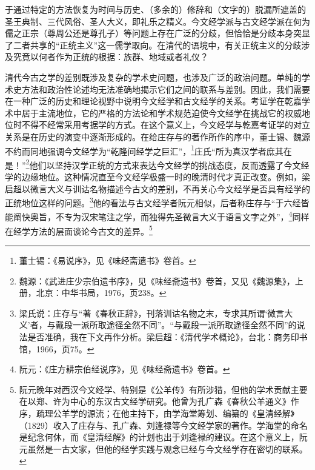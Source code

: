 \documentclass[a4paper, 12pt, openright]{ctexbook}
\begin{document}
于通过特定的方法恢复为时间与历史、（多余的）修辞和（文字的）脱漏所遮盖的圣王典制、三代风俗、圣人大义，即礼乐之精义。今文经学派与古文经学派在何为儒之正宗（尊周公还是尊孔子）等问题上存在广泛的分歧，但恰恰是分歧本身突显了二者共享的“正统主义”这一儒学取向。在清代的语境中，有关正统主义的分歧涉及究竟以何者作为正统的根据：族群、地域或者礼仪？

清代今古之学的差别既涉及复杂的学术史问题，也涉及广泛的政治问题。单纯的学术史方法和政治性论述均无法准确地揭示它们之间的联系与差别。因此，我们需要在一种广泛的历史和理论视野中说明今文经学和古文经学的关系。考证学在乾嘉学术中居于主流地位，它的严格的方法论和学术规范迫使今文经学在挑战它的权威地位时不得不经常采用考据学的方式。在这个意义上，今文经学与乾嘉考证学的对立关系是在历史的演变中逐渐形成的。在给庄存与的著作所作的序中，董士锡、魏源不约而同地强调今文经学为“乾隆间经学之巨汇”，\footnote{董士锡：《易说序》，见《味经斋遗书》卷首。}庄氏“所为真汉学者庶其在是！”\footnote{魏源：《武进庄少宗伯遗书序》，见《味经斋遗书》卷首，又见《魏源集》，上册，北京：中华书局，1976，页238。}他们以坚持汉学正统的方式来表达今文经学的挑战态度，反而透露了今文经学的边缘地位。这种情况直至今文经学极盛一时的晚清时代才真正改变。例如，梁启超以微言大义与训诂名物描述今古文的差别，不再关心今文经学是否具有经学的正统地位这样的问题。\footnote{梁氏说：庄存与“著《春秋正辞》，刊落训诂名物之末，专求其所谓‘微言大义’者，与戴段一派所取途径全然不同”。“与戴段一派所取途径全然不同”的说法是否准确，我在下文再作分析。梁启超：《清代学术概论》，台北：商务印书馆，1966，页75。}他的看法与古文经学者阮元相似，后者称庄存与“于六经皆能阐快奥旨，不专为汉宋笔注之学，而独得先圣微言大义于语言文字之外”，\footnote{阮元：《庄方耕宗伯经说序》，见《味经斋遗书》卷首。}同样在经学方法的层面谈论今古文的差异。\footnote{阮元晚年对西汉今文经学、特别是《公羊传》有所涉猎，但他的学术贡献主要在以郑、许为中心的东汉古文经学研究。他曾为孔广森《春秋公羊通义》作序，疏理公羊学的源流；在他主持下，由学海堂筹划、编纂的《皇清经解》（1829）收入了庄存与、孔广森、刘逢禄等今文经学家的著作。学海堂的命名是纪念何休，而《皇清经解》的计划也出于刘逢禄的建议。在这个意义上，阮元虽然是一古文家，但他的经学实践与观念已经与今文经学存在密切的联系。}
\end{document}
